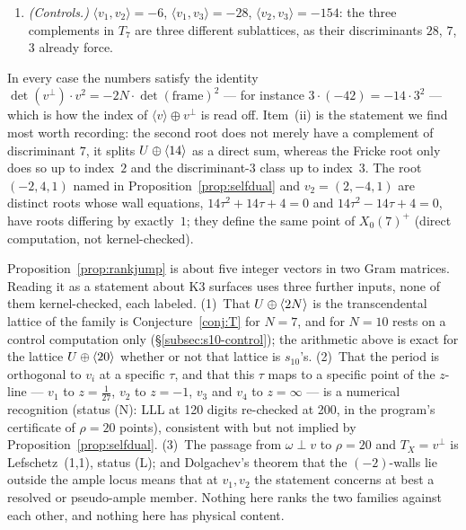 \begin{proposition}[status (K)]
\begin{enumerate}
  has $v_4^2=-20$, $\langle x,v_4\rangle=10(-x_0+x_1-6x_2)$, $x\perp v_4$ if
  and only if $x=(a,\,a+6b,\,b)$, reduced form
  $\bigl(\begin{smallmatrix}2&0\\0&2\end{smallmatrix}\bigr)=\lat2\oplus\lat2$
  on $(1,1,0),(-3,3,1)$, and frame determinant $2$.
\item \emph{(Controls.)} $\langle v_1,v_2\rangle=-6$,
  $\langle v_1,v_3\rangle=-28$, $\langle v_2,v_3\rangle=-154$: the three
  complements in $T_7$ are three different sublattices, as their
  discriminants $28$, $7$, $3$ already force.
\end{enumerate}
\end{proposition}

In every case the numbers satisfy the identity
$\det(v^{\perp})\cdot v^2 = -2N\cdot\det(\text{frame})^2$ --- for instance
$3\cdot(-42) = -14\cdot 3^2$ --- which is how the index of
$\langle v\rangle\oplus v^{\perp}$ is read off. Item~(ii) is the statement we
find most worth recording: the second root does not merely have a complement
of discriminant $7$, it splits $U\oplus\langle 14\rangle$ as a direct sum, whereas the
Fricke root only does so up to index~$2$ and the discriminant-$3$ class up to
index~$3$. The root $(-2,4,1)$ named in Proposition~\ref{prop:selfdual} and
$v_2=(2,-4,1)$ are distinct roots whose wall equations,
$14\tau^2+14\tau+4=0$ and $14\tau^2-14\tau+4=0$, have roots differing by
exactly~$1$; they define the same point of $X_0(7)^{+}$ (direct computation,
not kernel-checked).

\begin{remark}\label{rem:rankjump-status}
Proposition~\ref{prop:rankjump} is about five integer vectors in two Gram
matrices. Reading it as a statement about K3 surfaces uses three further
inputs, none of them kernel-checked, each labeled. (1)~That
$U\oplus\langle 2N\rangle$ is the transcendental lattice of the family is
Conjecture~\ref{conj:T} for $N=7$, and for $N=10$ rests on a control
computation only (\S\ref{subsec:s10-control}); the arithmetic above is exact
for the lattice $U\oplus\langle 20\rangle$ whether or not that lattice is $s_{10}$'s.
(2)~That the period is orthogonal to $v_i$ at a specific $\tau$, and that this
$\tau$ maps to a specific point of the $z$-line --- $v_1$ to $z=\tfrac1{27}$,
$v_2$ to $z=-1$, $v_3$ and $v_4$ to $z=\infty$ --- is a numerical recognition
(status (N): LLL at 120 digits re-checked at 200, in the program's
certificate of $\rho=20$ points), consistent with but not implied by
Proposition~\ref{prop:selfdual}. (3)~The passage from $\omega\perp v$ to
$\rho=20$ and $T_X=v^{\perp}$ is Lefschetz~(1,1), status (L); and Dolgachev's
theorem that the $(-2)$-walls lie outside the ample locus
\cite[Thm.~7.3]{Dolgachev1996} means that at $v_1,v_2$ the statement concerns
at best a resolved or pseudo-ample member. Nothing here ranks the two
families against each other, and nothing here has physical content.
\end{remark}

